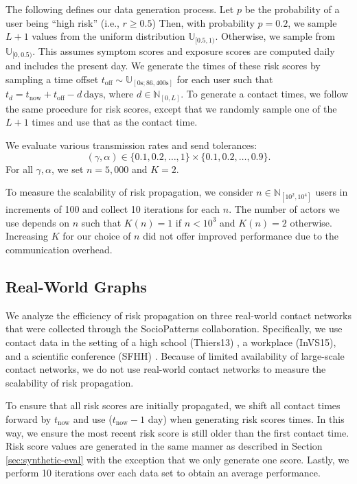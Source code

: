 \par The following defines our data generation process. Let $p$ be the probability of a user being ``high risk'' (i.e., $r \geq 0.5$) Then, with probability $p = 0.2$, we sample $L + 1$ values from the uniform distribution $\mathbb{U}_{[0.5, 1)}$. Otherwise, we sample from $\mathbb{U}_{[0, 0.5)}$. This assumes symptom scores and exposure scores are computed daily and includes the present day. We generate the times of these risk scores by sampling a time offset $t_{\text{off}} \sim \mathbb{U}_{[0\text{s}; 86,400\text{s}]}$ for each user such that $t_d = t_{\text{now}} + t_{\text{off}} - d~\text{days}$, where $d \in \mathbb{N}_{[0, L]}$. To generate a contact times, we follow the same procedure for risk scores, except that we randomly sample one of the $L + 1$ times and use that as the contact time.

\par We evaluate various transmission rates and send tolerances:
\begin{displaymath}
	(\gamma, \alpha) \in \{0.1, 0.2, \ldots, 1\} \times \{0.1, 0.2, \ldots, 0.9\}.
\end{displaymath}
For all $\gamma, \alpha$, we set $n = 5,000$ and $K = 2$.

\par To measure the scalability of risk propagation, we consider $n \in \mathbb{N}_{[10^2, 10^4]}$ users in increments of 100 and collect 10 iterations for each $n$. The number of actors we use depends on $n$ such that $K(n) = 1$ if $n < 10^3$ and $K(n) = 2$ otherwise. Increasing $K$ for our choice of $n$ did not offer improved performance due to the communication overhead.

\subsection{Real-World Graphs}

\par We analyze the efficiency of risk propagation on three real-world contact networks that were collected through the SocioPatterns collaboration. Specifically, we use contact data in the setting of a high school (Thiers13) \cite{Fournet2014}, a workplace (InVS15), and a scientific conference (SFHH) \cite{Genois2018}. Because of limited availability of large-scale contact networks, we do not use real-world contact networks to measure the scalability of risk propagation. 

\par To ensure that all risk scores are initially propagated, we shift all contact times forward by $t_{\text{now}}$ and use ($t_{\text{now}} - 1$ day) when generating risk scores times. In this way, we ensure the most recent risk score is still older than the first contact time. Risk score values are generated in the same manner as described in Section \ref{sec:synthetic-eval} with the exception that we only generate one score. Lastly, we perform 10 iterations over each data set to obtain an average performance.

